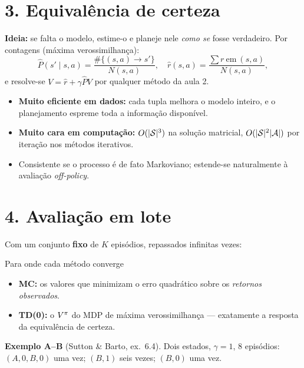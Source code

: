 \documentclass[11pt, a4paper]{article}
\begin{document}
\section{3. Equivalência de certeza}

\textbf{Ideia:} se falta o modelo, estime-o e planeje nele \emph{como se}
fosse verdadeiro. Por contagens (máxima verossimilhança):
\[
  \hat{P}(s'\mid s,a) = \frac{\#\{(s,a)\rightarrow s'\}}{N(s,a)},
  \quad
  \hat{r}(s,a) = \frac{\textstyle\sum r\ \text{em}\ (s,a)}{N(s,a)},
\]
e resolve-se $V = \hat{r} + \gamma\hat{P}V$ por qualquer método da aula 2.

\begin{itemize}
  \item \textbf{Muito eficiente em dados:} cada tupla melhora o modelo inteiro,
        e o planejamento espreme toda a informação disponível.
  \item \textbf{Muito cara em computação:} $O(\lvert\mathcal{S}\rvert^3)$ na solução matricial,
        $O(\lvert\mathcal{S}\rvert^2\lvert\mathcal{A}\rvert)$ por iteração nos métodos iterativos.
  \item Consistente se o processo é de fato Markoviano; estende-se
        naturalmente à avaliação \emph{off-policy}.
\end{itemize}

\section{4. Avaliação em lote}

Com um conjunto \textbf{fixo} de $K$ episódios, repassados infinitas vezes:

\begin{teobox}{Para onde cada método converge}
  \begin{itemize}[topsep=0.1em]
    \item \textbf{MC:} os valores que minimizam o erro quadrático sobre os
          \emph{retornos observados}.
    \item \textbf{TD(0):} o $V^{\pi}$ do MDP de máxima verossimilhança —
          exatamente a resposta da equivalência de certeza.
  \end{itemize}
\end{teobox}

\textbf{Exemplo A--B} (Sutton \& Barto, ex.\ 6.4). Dois estados, $\gamma=1$,
8 episódios: $(A,0,B,0)$ uma vez; $(B,1)$ seis vezes; $(B,0)$ uma vez.
\end{document}
